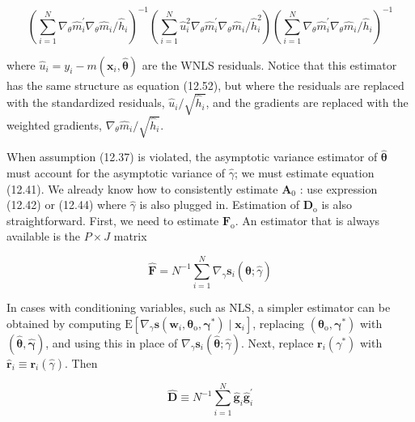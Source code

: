 \documentclass[10pt]{article}
\begin{document}
\begin{equation*}
\left(\sum_{i=1}^{N} \nabla_{\theta} \hat{m}_{i}^{\prime} \nabla_{\theta} \hat{m}_{i} / \hat{h}_{i}\right)^{-1}\left(\sum_{i=1}^{N} \hat{u}_{i}^{2} \nabla_{\theta} \hat{m}_{i}^{\prime} \nabla_{\theta} \hat{m}_{i} / \hat{h}_{i}^{2}\right)\left(\sum_{i=1}^{N} \nabla_{\theta} \hat{m}_{i}^{\prime} \nabla_{\theta} \hat{m}_{i} / \hat{h}_{i}\right)^{-1} \tag{12.60}
\end{equation*}


where $\hat{u}_{i}=y_{i}-m\left(\mathbf{x}_{i}, \hat{\boldsymbol{\theta}}\right)$ are the WNLS residuals. Notice that this estimator has the same structure as equation (12.52), but where the residuals are replaced with the standardized residuals, $\hat{u}_{i} / \sqrt{\hat{h}_{i}}$, and the gradients are replaced with the weighted gradients, $\nabla_{\theta} \hat{m}_{i} / \sqrt{\hat{h}_{i}}$.

When assumption (12.37) is violated, the asymptotic variance estimator of $\hat{\boldsymbol{\theta}}$ must account for the asymptotic variance of $\hat{\gamma}$; we must estimate equation (12.41). We already know how to consistently estimate $\mathbf{A}_{0}$ : use expression (12.42) or (12.44) where $\hat{\gamma}$ is also plugged in. Estimation of $\mathbf{D}_{\mathrm{o}}$ is also straightforward. First, we need to estimate $\mathbf{F}_{\mathrm{o}}$. An estimator that is always available is the $P \times J$ matrix


\begin{equation*}
\hat{\mathbf{F}}=N^{-1} \sum_{i=1}^{N} \nabla_{\gamma} \mathbf{s}_{i}(\hat{\boldsymbol{\theta}} ; \hat{\gamma}) \tag{12.61}
\end{equation*}


In cases with conditioning variables, such as NLS, a simpler estimator can be obtained by computing $\mathrm{E}\left[\nabla_{\gamma} \mathbf{s}\left(\mathbf{w}_{i}, \boldsymbol{\theta}_{\mathrm{o}}, \boldsymbol{\gamma}^{*}\right) \mid \mathbf{x}_{i}\right]$, replacing $\left(\boldsymbol{\theta}_{\mathrm{o}}, \boldsymbol{\gamma}^{*}\right)$ with $(\hat{\boldsymbol{\theta}}, \hat{\boldsymbol{\gamma}})$, and using this in place of $\nabla_{\gamma} \mathbf{s}_{i}(\hat{\boldsymbol{\theta}} ; \hat{\gamma})$. Next, replace $\mathbf{r}_{i}\left(\gamma^{*}\right)$ with $\hat{\mathbf{r}}_{i} \equiv \mathbf{r}_{i}(\hat{\gamma})$. Then


\begin{equation*}
\hat{\mathbf{D}} \equiv N^{-1} \sum_{i=1}^{N} \hat{\mathbf{g}}_{i} \hat{\mathbf{g}}_{i}^{\prime} \tag{12.62}
\end{equation*}
\end{document}
